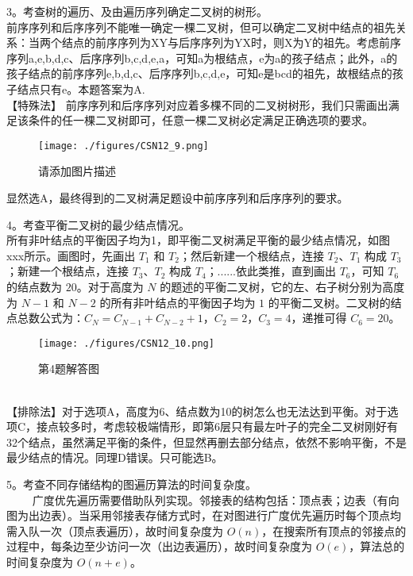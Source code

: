 3。考查树的遍历、及由遍历序列确定二叉树的树形。\\
前序序列和后序序列不能唯一确定一棵二叉树，但可以确定二叉树中结点的祖先关系：当两个结点的前序序列为XY与后序序列为YX时，则X为Y的祖先。考虑前序序列a,e,b,d,c、后序序列b,c,d,e,a，可知a为根结点，e为a的孩子结点；此外，a的孩子结点的前序序列e,b,d,c、后序序列b,c,d,e，可知e是bcd的祖先，故根结点的孩子结点只有e。本题答案为A. \\
【特殊法】 前序序列和后序序列对应着多棵不同的二叉树树形，我们只需画出满足该条件的任一棵二叉树即可，任意一棵二叉树必定满足正确选项的要求。
\begin{figure}[ht]
\centering
\texttt{[image: ./figures/CSN12\_9.png]}
\caption{请添加图片描述} \label{CSN12_fig9}
\end{figure}
显然选A，最终得到的二叉树满足题设中前序序列和后序序列的要求。

4。考查平衡二叉树的最少结点情况。\\
所有非叶结点的平衡因子均为1，即平衡二叉树满足平衡的最少结点情况，如图xxx所示。画图时，先画出 $T_1$ 和 $T_2$；然后新建一个根结点，连接 $T_2$、$T_1$ 构成 $T_3$；新建一个根结点，连接 $T_3$、$T_2$ 构成 $T_4$；......依此类推，直到画出 $T_6$，可知 $T_6$ 的结点数为 $20$。对于高度为 $N$ 的题述的平衡二叉树，它的左、右子树分别为高度为 $N-1$ 和 $N-2$ 的所有非叶结点的平衡因子均为 $1$ 的平衡二叉树。二叉树的结点总数公式为：$C_N=C_{N-1}+C_{N-2}+1$，$C_2=2$，$C_3=4$，递推可得 $C_6=20$。
\begin{figure}[ht]
\centering
\texttt{[image: ./figures/CSN12\_10.png]}
\caption{第4题解答图} \label{CSN12_fig10}
\end{figure} \\
【排除法】对于选项A，高度为6、结点数为10的树怎么也无法达到平衡。对于选项C，接点较多时，考虑较极端情形，即第6层只有最左叶子的完全二叉树刚好有32个结点，虽然满足平衡的条件，但显然再删去部分结点，依然不影响平衡，不是最少结点的情况。同理D错误。只可能选B。

5。考查不同存储结构的图遍历算法的时间复杂度。\\
$\qquad$ 广度优先遍历需要借助队列实现。邻接表的结构包括：顶点表；边表（有向图为出边表）。当采用邻接表存储方式时，在对图进行广度优先遍历时每个顶点均需入队一次（顶点表遍历），故时间复杂度为 $O(n)$，在搜索所有顶点的邻接点的过程中，每条边至少访问一次（出边表遍历），故时间复杂度为 $O(e)$，算法总的时间复杂度为 $O(n+e)$。

